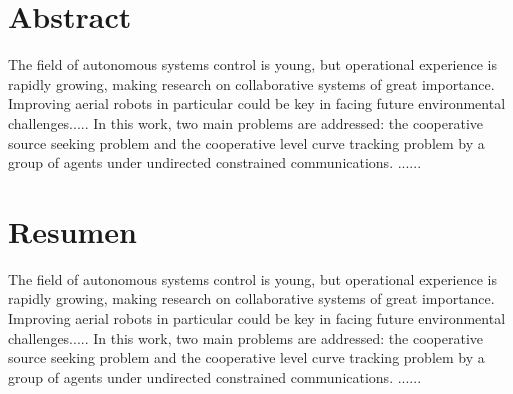 \chapter*{Abstract} \label{abstract}
\setcounter{page}{5} 
The field of autonomous systems control is young, but operational experience is rapidly growing, making research on collaborative systems of great importance. Improving aerial robots in particular could be key in facing future environmental challenges.....
In this work, two main problems are addressed: the cooperative source seeking problem and the cooperative level curve tracking problem by a group of agents under undirected constrained communications. ......

\newpage
\thispagestyle{empty}
\mbox{}

\chapter*{Resumen} \label{resumen}

The field of autonomous systems control is young, but operational experience is rapidly growing, making research on collaborative systems of great importance. Improving aerial robots in particular could be key in facing future environmental challenges.....
In this work, two main problems are addressed: the cooperative source seeking problem and the cooperative level curve tracking problem by a group of agents under undirected constrained communications. ......
